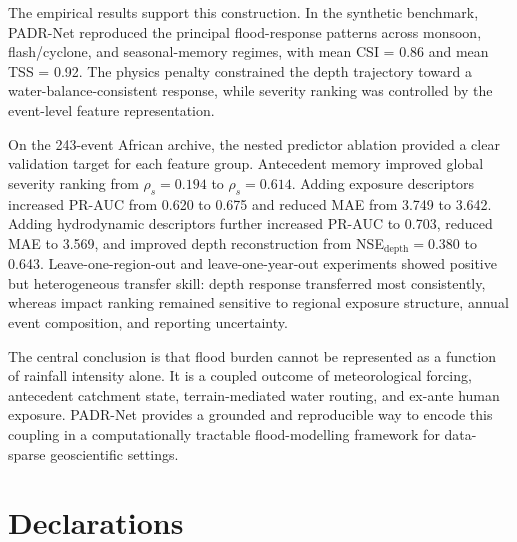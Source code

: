 \documentclass[pdflatex,sn-mathphys-ay]{sn-jnl}
\theoremstyle{thmstyleone}
\begin{document}
The empirical results support this construction.  In the synthetic
benchmark, PADR-Net reproduced the principal flood-response patterns
across monsoon, flash/cyclone, and seasonal-memory regimes, with mean
CSI = 0.86 and mean TSS = 0.92.  The physics penalty constrained the
depth trajectory toward a water-balance-consistent response, while
severity ranking was controlled by the event-level feature
representation.

On the 243-event African archive, the nested predictor ablation
provided a clear validation target for each feature group.  Antecedent
memory improved global severity ranking from $\rho_s=0.194$ to
$\rho_s=0.614$.  Adding exposure descriptors increased PR-AUC from
0.620 to 0.675 and reduced MAE from 3.749 to 3.642.  Adding
hydrodynamic descriptors further increased PR-AUC to 0.703, reduced
MAE to 3.569, and improved depth reconstruction from
NSE$_\mathrm{depth}=0.380$ to 0.643.  Leave-one-region-out and
leave-one-year-out experiments showed positive but heterogeneous
transfer skill: depth response transferred most consistently, whereas
impact ranking remained sensitive to regional exposure structure,
annual event composition, and reporting uncertainty.

The central conclusion is that flood burden cannot be represented as a
function of rainfall intensity alone.  It is a coupled outcome of
meteorological forcing, antecedent catchment state, terrain-mediated
water routing, and ex-ante human exposure.  PADR-Net provides a grounded and reproducible way to encode this coupling in
a computationally tractable flood-modelling framework for data-sparse
geoscientific settings.


\section*{Declarations}
\end{document}
